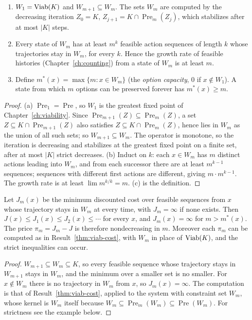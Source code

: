 \begin{newresult}\label{thm:m-kernel}
\begin{enumerate}[nosep,label=(\alph*)]
  \item $W_1=\operatorname{Viab}(K)$ and $W_{m+1}\subseteq W_m$. The sets $W_m$ are computed by the decreasing iteration $Z_0=K$, $Z_{j+1}=K\cap\operatorname{Pre}_m(Z_j)$, which stabilizes after at most $|K|$ steps.
  \item Every state of $W_m$ has at least $m^{k}$ feasible action sequences of length $k$ whose trajectories stay in $W_m$, for every $k$. Hence the growth rate of feasible histories (Chapter~\ref{ch:counting}) from a state of $W_m$ is at least $m$.
  \item Define $m^{*}(x)=\max\{m:x\in W_m\}$ (the \emph{option capacity}, $0$ if $x\notin W_1$). A state from which $m$ options can be preserved forever has $m^{*}(x)\ge m$.
\end{enumerate}
\end{newresult}
\begin{proof}
(a) $\operatorname{Pre}_1=\operatorname{Pre}$, so $W_1$ is the greatest fixed point of Chapter~\ref{ch:viability}. Since $\operatorname{Pre}_{m+1}(Z)\subseteq\operatorname{Pre}_m(Z)$, a set $Z\subseteq K\cap\operatorname{Pre}_{m+1}(Z)$ also satisfies $Z\subseteq K\cap\operatorname{Pre}_m(Z)$, hence lies in $W_m$ as the union of all such sets; so $W_{m+1}\subseteq W_m$. The operator is monotone, so the iteration is decreasing and stabilizes at the greatest fixed point on a finite set, after at most $|K|$ strict decreases. (b) Induct on $k$: each $x\in W_m$ has $m$ distinct actions leading into $W_m$, and from each successor there are at least $m^{k-1}$ sequences; sequences with different first actions are different, giving $m\cdot m^{k-1}$. The growth rate is at least $\lim m^{k/k}=m$. (c) is the definition.
\end{proof}

\begin{newresult}\label{prop:m-price}
Let $J_m(x)$ be the minimum discounted cost over feasible sequences from $x$ whose trajectory stays in $W_m$ at every time, with $J_m=\infty$ if none exists. Then $J(x)\le J_1(x)\le J_2(x)\le\cdots$ for every $x$, and $J_m(x)=\infty$ for $m>m^{*}(x)$. The price $\pi_m=J_m-J$ is therefore nondecreasing in $m$. Moreover each $\pi_m$ can be computed as in Result~\ref{thm:viab-cost}, with $W_m$ in place of $\operatorname{Viab}(K)$, and the strict inequalities can occur.
\end{newresult}
\begin{proof}
$W_{m+1}\subseteq W_m\subseteq K$, so every feasible sequence whose trajectory stays in $W_{m+1}$ stays in $W_m$, and the minimum over a smaller set is no smaller. For $x\notin W_m$ there is no trajectory in $W_m$ from $x$, so $J_m(x)=\infty$. The computation is that of Result~\ref{thm:viab-cost}, applied to the system with constraint set $W_m$, whose kernel is $W_m$ itself because $W_m\subseteq\operatorname{Pre}_m(W_m)\subseteq\operatorname{Pre}(W_m)$. For strictness see the example below.
\end{proof}

